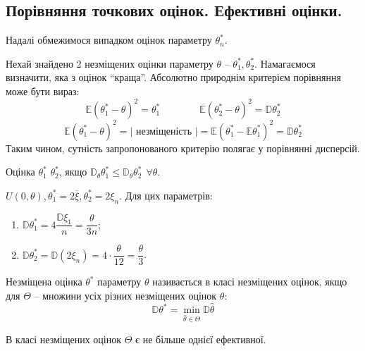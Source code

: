 \subsection{Порівняння точкових оцінок. Ефективні оцінки.}
\def\theval{\theta^*}
Надалі обмежимося випадком  оцінок параметру $\theta^*_n$.\par
Нехай знайдено 2 незміщених оцінки параметру $\theta$ -- $\theta_1^*, \theta_2^*$. Намагаємося визначити, яка з оцінок ``краща''. Абсолютно природнім критерієм порівняння може бути вираз:
$$
\mathbb{E} (\theval_1  - \theta)^2 = \theval_1  \qquad  \qquad \mathbb{E} (\theval_2  - \theta)^2 = \mathbb{D} \theval_2
$$
$$
\mathbb{E} (\theval_1  - \theta)^2 =	\bigg| \text{ незміщеність } \bigg|	= \mathbb{E} (\theta_1^* - \mathbb{E} \theval_1)^2 = \mathbb{D} \theval_2
$$
Таким чином, сутність запропонованого критерію полягає у порівнянні дисперсій.
\begin{defo}
 Оцінка $\theval_1$  $\theval_2$, якщо $\mathbb{D}_\theta \theval_1 \leq \mathbb{D}_\theta \theval_2 \ \  \forall \theta$.
\end{defo}
\begin{example}
 $U(0, \theta), \theval_1 = 2 \overline{\xi}, \theval_2 = 2 \xi_n.$ Для цих параметрів:
 \begin{enumerate}
 \item $ \mathbb{D} \theval_1 = 4 \dfrac{\mathbb{D} \xi_1}{n} = \dfrac{\theta}{3n}  $;
 	\item $\mathbb{D} \theval_2 = \mathbb{D} (2 \xi_n) = 	4 \cdot \dfrac{\theta}{12} = \dfrac{\theta}{3}$.
 \end{enumerate}
\end{example}
\begin{defo}
 Незміщена оцінка $\theval$ параметру $\theta$ називається  в класі незміщених оцінок, якщо для $\Theta$ -- множини усіх різних незміщених оцінок $\theta$:
 $$
 \mathbb{D} \theval =  \min\limits_{\hat{\theta} \in {\Theta}}{\mathbb{D} \hat{\theta}}
 $$
\end{defo}
\begin{boxteo}
В класі незміщених оцінок $\Theta$ є не більше однієї ефективної.
\end{boxteo}
